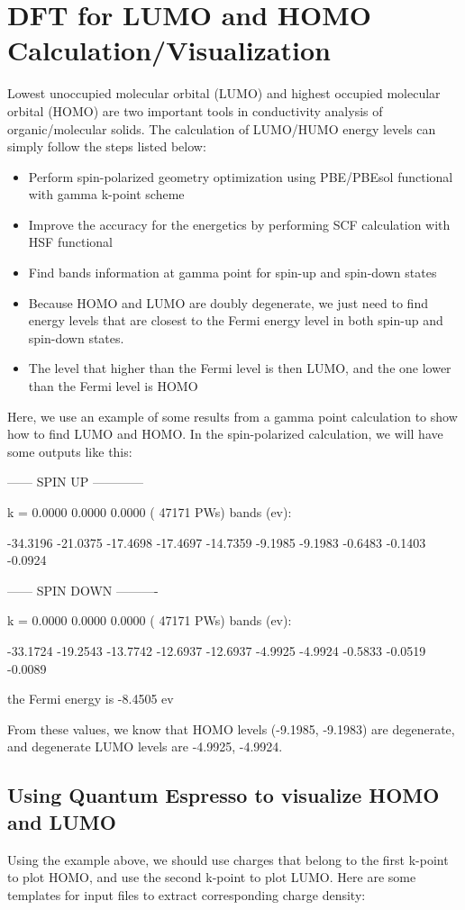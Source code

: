 \documentclass[12pt]{article}
\newenvironment{res}
    { \begin{mdframed}[backgroundcolor=orange!10]}
    {  \end{mdframed}}
\begin{document}
\section{DFT for LUMO and HOMO Calculation/Visualization}
Lowest unoccupied molecular orbital (LUMO) and highest occupied molecular orbital (HOMO) are two important tools in conductivity analysis of organic/molecular solids. The calculation of LUMO/HUMO energy levels can simply follow the steps listed below:
\begin{itemize}
    \item Perform spin-polarized geometry optimization using PBE/PBEsol functional with gamma k-point scheme
    \item Improve the accuracy for the energetics by performing SCF calculation with HSF functional
    \item Find bands information at gamma point for spin-up and spin-down states
    \item Because HOMO and LUMO are doubly degenerate, we just need to find energy levels that are closest to the Fermi energy level in both spin-up and spin-down states.
    \item The level that higher than the Fermi level is then LUMO, and the one lower than the Fermi level is HOMO
\end{itemize}
Here, we use an example of some results from a gamma point calculation to show how to find LUMO and HOMO. In the spin-polarized calculation, we will have some outputs like this:
\begin{res}
------ SPIN UP ------------


          k = 0.0000 0.0000 0.0000 ( 47171 PWs)   bands (ev):

   -34.3196 -21.0375 -17.4698 -17.4697 -14.7359  -9.1985  -9.1983  -0.6483
    -0.1403  -0.0924

 ------ SPIN DOWN ----------


          k = 0.0000 0.0000 0.0000 ( 47171 PWs)   bands (ev):

   -33.1724 -19.2543 -13.7742 -12.6937 -12.6937  -4.9925  -4.9924  -0.5833
    -0.0519  -0.0089

     the Fermi energy is    -8.4505 ev
\end{res}
From these values, we know that HOMO levels (-9.1985, -9.1983) are degenerate, and degenerate LUMO levels are -4.9925, -4.9924.

\subsection{Using Quantum Espresso to visualize HOMO and LUMO}
Using the example above, we should use charges that belong to the first k-point to plot HOMO, and use the second k-point to plot LUMO. Here are some templates for input files to extract corresponding charge density:
\end{document}
